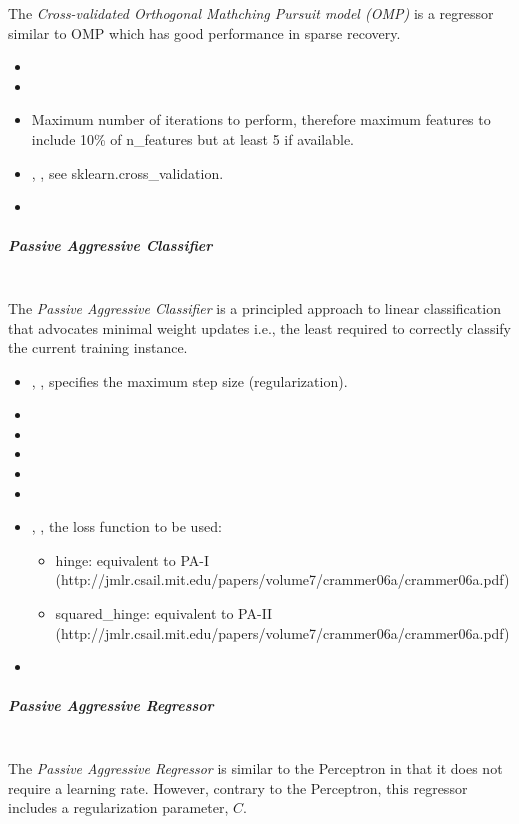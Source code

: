The \textit{Cross-validated Orthogonal Mathching Pursuit model (OMP)} is a
regressor similar to OMP which has good performance in sparse recovery.
%
\begin{itemize}
  \item {}
  \item {}
  \item {}
  Maximum number of iterations to perform, therefore maximum features to
  include 10\% of n\_features but at least 5 if available.
  \item {}, ,
  see sklearn.cross\_validation.
  \item {}
\end{itemize}
\subparagraph{Passive Aggressive Classifier}
\mbox{}
\\The \textit{Passive Aggressive Classifier} is a principled approach to linear
classification that advocates minimal weight updates i.e., the least required
to correctly classify the current training instance.
%
\begin{itemize}
  \item {}, , specifies the maximum step size
  (regularization).
  \item {}
  \item {}
  \item {}
  \item {}
  \item {}
  \item {}, , the loss function to
  be used:
  \begin{itemize}
    \item hinge: equivalent to PA-I (http://jmlr.csail.mit.edu/papers/volume7/crammer06a/crammer06a.pdf)
    \item squared\_hinge: equivalent to PA-II (http://jmlr.csail.mit.edu/papers/volume7/crammer06a/crammer06a.pdf)
  \end{itemize}
  \item {}
\end{itemize}
\subparagraph{Passive Aggressive Regressor}
\mbox{}
\\The \textit{Passive Aggressive Regressor} is similar to the Perceptron in that
it does not require a learning rate.
%
However, contrary to the Perceptron, this regressor includes a regularization
parameter, $C$.

